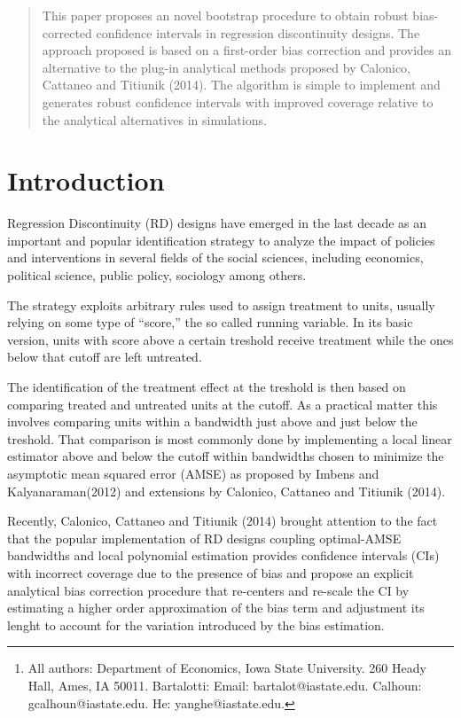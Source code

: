 \documentclass[12pt,fleqn]{article}
\author{Ot\'avio Bartalotti \and Gray Calhoun \and Yang He\thanks{All authors: 
Department of Economics, Iowa State University. 260 Heady Hall, Ames, IA  50011.
Bartalotti: Email: bartalot@iastate.edu. Calhoun: gcalhoun@iastate.edu.
He: yanghe@iastate.edu.}}
\begin{document}
\maketitle

\begin{abstract}
This paper proposes an novel bootstrap procedure to obtain robust bias-corrected
confidence intervals in regression discontinuity designs. The approach proposed 
is based on a first-order bias correction and provides an alternative
to the plug-in analytical methods proposed by Calonico, Cattaneo and Titiunik (2014).
The algorithm is simple to implement and generates robust confidence intervals
with improved coverage relative to the analytical alternatives in simulations.
\end{abstract}

\section{Introduction}
Regression Discontinuity (RD) designs have emerged in the last decade as an 
important and popular identification strategy to analyze the impact of policies
and interventions in several fields of the social sciences, including economics,
political science, public policy, sociology among others.

The strategy exploits arbitrary rules used to assign treatment to units, usually
relying on some type of ``score,'' the so called running variable. In its basic 
version, units with score above a certain treshold receive treatment while the 
ones below that cutoff are left untreated.

The identification of the treatment effect at the treshold is then based on 
comparing treated and untreated units at the cutoff. As a practical matter this 
involves comparing units within a bandwidth just above and just below the 
treshold. That comparison is most commonly done by implementing a local linear
estimator above and below the cutoff within bandwidths chosen to minimize the 
asymptotic mean squared error (AMSE) as proposed by Imbens and Kalyanaraman(2012)
and extensions by Calonico, Cattaneo and Titiunik (2014).

Recently, Calonico, Cattaneo and Titiunik (2014) brought attention to the fact
that the popular implementation of RD designs coupling optimal-AMSE bandwidths
and local polynomial estimation provides confidence intervals (CIs) with
incorrect coverage due to the presence of bias and propose an explicit analytical
bias correction procedure that re-centers and re-scale the CI by estimating a higher 
order approximation of the bias term and adjustment its lenght to account for 
the variation introduced by the bias estimation.
\end{document}
